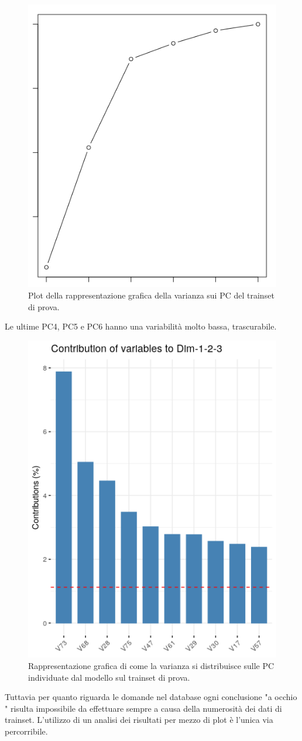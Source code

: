 \begin{figure}[H]
\centering
	\includegraphics[width=0.60\linewidth]{../../PCA/plot/variances2_rete-prova.png}
	\caption{Plot della rappresentazione grafica della varianza sui PC del trainset di prova.}
\end{figure}
\noindent
Le ultime PC4, PC5 e PC6 hanno una variabilit\`a molto bassa, trascurabile.
\begin{figure}[H]
\centering
	\includegraphics[width=0.60\linewidth]{../../PCA/plot/varianza-complessiva_rete-prova.png}
	\caption{Rappresentazione grafica di come la varianza si distribuisce sulle PC individuate dal modello sul trainset di prova.}
\end{figure}
\noindent
Tuttavia per quanto riguarda le domande nel database ogni conclusione "a occhio " risulta  impossibile da effettuare sempre a causa della numerosit\`a dei dati di trainset. L'utilizzo di un analisi dei risultati per mezzo di plot \`e l'unica via percorribile.

